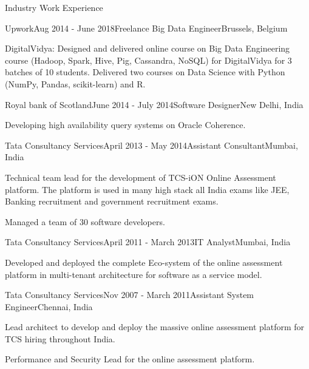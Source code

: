 \documentclass{resume} %
\begin{document}
\begin{rSection}{Industry Work Experience}
\begin{rSubsection}{Upwork}{Aug 2014 - June 2018}{Freelance Big Data Engineer}{Brussels, Belgium}
\item DigitalVidya: Designed and delivered online course on Big Data Engineering course (Hadoop, Spark, Hive, Pig, Cassandra, NoSQL) for DigitalVidya for 3 batches of 10 students. Delivered two courses on Data Science with Python (NumPy, Pandas, scikit-learn) and R.
\end{rSubsection}
\begin{rSubsection}{Royal bank of Scotland}{June 2014 - July 2014}{Software Designer}{New Delhi, India}
\item Developing high availability query systems on Oracle Coherence.
\end{rSubsection}
\begin{rSubsection}{Tata Consultancy Services}{April 2013 - May 2014}{Assistant Consultant}{Mumbai, India}
\item Technical team lead for the development of TCS-iON Online Assessment platform. The platform is used in many high stack all India exams like JEE, Banking recruitment and government recruitment exams. 
\item Managed a team of $30$ software developers.  
\end{rSubsection}
\begin{rSubsection}{Tata Consultancy Services}{April 2011 - March 2013}{IT Analyst}{Mumbai, India}
\item Developed and deployed the complete Eco-system of the online assessment platform in multi-tenant architecture for software as a service model.
\end{rSubsection}
\begin{rSubsection}{Tata Consultancy Services}{Nov 2007 - March 2011}{Assistant System Engineer}{Chennai, India}
\item Lead architect to develop and deploy the massive online assessment platform for TCS hiring throughout India.
\item Performance and Security Lead for the online assessment platform.
\end{rSubsection}
\end{rSection}

\end{document}
